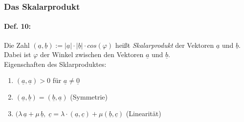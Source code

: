 \subsubsection{Das Skalarprodukt}
\paragraph{Def. 10:} \parskp
Die Zahl $(\underline{a}, \underline{b}):=|\underline{a}|\cdot |\underline{b}|\cdot cos (\varphi)$ heißt \emph{Skalarprodukt} der Vektoren $\underline{a}$ und $\underline{b}$. Dabei ist $\varphi$ der Winkel zwischen den Vektoren $\underline{a}$ und $\underline{b}$.\medskip\\
Eigenschaften des Sklarproduktes:
\begin{enumerate}[label=\alph*.)]
\item $(\underline{a}, \underline{a})>0$ für $\underline{a}\not = \underline{0}$
\item $(\underline{a}, \underline{b})=(\underline{b}, \underline{a})$ (Symmetrie)
\item $(\lambda\, \underline{a}+\mu\, \underline{b},\; \underline{c}=\lambda\cdot (\underline{a}, \underline{c})+\mu(\underline{b}, \underline{c})$ (Linearität)
\end{enumerate}

